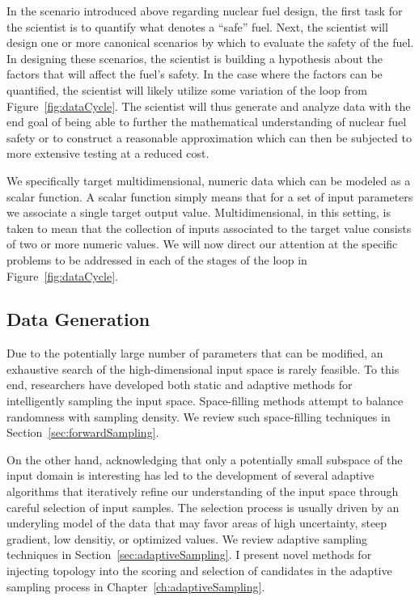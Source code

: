 In the scenario introduced above regarding nuclear fuel design, the first task for the scientist is to quantify what denotes a ``safe'' fuel.
%
Next, the scientist will design one or more canonical scenarios by which to evaluate the safety of the fuel.
%
In designing these scenarios, the scientist is building a hypothesis about the factors that will affect the fuel's safety.
%
In the case where the factors can be quantified, the scientist will likely utilize some variation of the loop from Figure~\ref{fig:dataCycle}.
%
The scientist will thus generate and analyze data with the end goal of being able to further the mathematical understanding of nuclear fuel safety or to construct a reasonable approximation which can then be subjected to more extensive testing at a reduced cost.

We specifically target multidimensional, numeric data which can be modeled as a scalar function.
%
A scalar function simply means that for a set of input parameters we associate a single target output value.
%
Multidimensional, in this setting, is taken to mean that the collection of inputs associated to the target value consists of two or more numeric values.
%
We will now direct our attention at the specific problems to be addressed in each of the stages of the loop in Figure~\ref{fig:dataCycle}.

\subsection{Data Generation}

Due to the potentially large number of parameters that can be modified, an exhaustive search of the high-dimensional input space is rarely feasible.
%
To this end, researchers have developed both static and adaptive methods for intelligently sampling the input space.
%
Space-filling methods attempt to balance randomness with sampling density.
%
We review such space-filling techniques in Section~\ref{sec:forwardSampling}.

On the other hand, acknowledging that only a potentially small subspace of the input domain is interesting has led to the development of several adaptive algorithms that iteratively refine our understanding of the input space through careful selection of input samples.
%
The selection process is usually driven by an underyling model of the data that may favor areas of high uncertainty, steep gradient, low densitiy, or optimized values.
%
We review adaptive sampling techniques in Section~\ref{sec:adaptiveSampling}.
%
I present novel methods for injecting topology into the scoring and selection of candidates in the adaptive sampling process in Chapter~\ref{ch:adaptiveSampling}.

